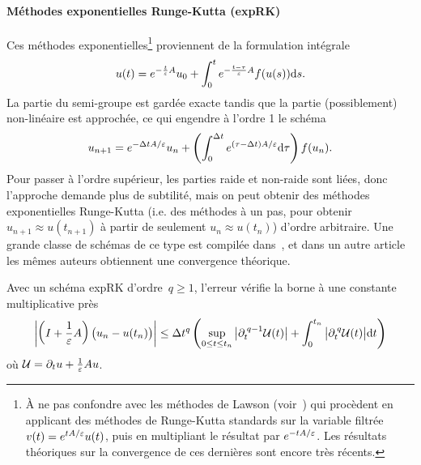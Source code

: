 

\paragraph{Méthodes exponentielles Runge-Kutta (expRK)\\}

Ces méthodes exponentielles\footnote{À ne pas confondre avec les méthodes de Lawson (voir~\cite{lawson.1967.generalized,hochbruck.2020.convergence}) qui procèdent en applicant des méthodes de Runge-Kutta standards sur la variable filtrée $v(t) = e^{t A/\varepsilon}u(t)$, puis en multipliant le résultat par $e^{-t A/\varepsilon}$. Les résultats théoriques sur la convergence de ces dernières sont encore très récents.} proviennent de la formulation intégrale
\begin{equation*}
    u(t) = e^{-\frac{t}{\varepsilon}A}u_0 + \int_0^t e^{-\frac{t-\tau}{\varepsilon}A} f(u(s)) \mathrm{d} s .
\end{equation*}
La partie du semi-groupe est gardée exacte tandis que la partie (possiblement) non-linéaire est approchée, ce qui engendre à l'ordre 1 le schéma
\begin{equation} \label{sec:intro:eq:expEuler}
    u_{n+1} = e^{-\Delta t A/\varepsilon} u_n + \left(\int_0^{\Delta t} e^{(\tau-\Delta t) A/\varepsilon} \mathrm{d}\tau \right) f(u_n) .
\end{equation}
Pour passer à l'ordre supérieur, les parties raide et non-raide sont liées, donc l'approche demande plus de subtilité, mais on peut obtenir des méthodes exponentielles Runge-Kutta (i.e. des méthodes à un pas, pour obtenir $u_{n+1} \approx u(t_{n+1})$ à partir de seulement $u_n \approx u(t_n)$) d'ordre arbitraire. Une grande classe de schémas de ce type est compilée dans~\cite{hochbruck.2005.explicit}, et dans un autre article les mêmes auteurs obtiennent une convergence théorique. 
\begin{FRtheorem*}
    Avec un schéma expRK d'ordre~$q \geq 1$, l'erreur vérifie la borne à une constante multiplicative près
    \begin{equation*}
        \left| 
            \left( I + \frac{1}{\varepsilon}A \right) \big( u_n - u(t_n) \big) 
        \right|
        \leq \Delta t^{q} \left( 
            \sup_{0 \leq t \leq t_n} \big| \partial_t^{\: q-1} \mathcal{U}(t) \big| 
            + \int_0^{t_n} \big| \partial_t^{\: q} \mathcal{U}(t) \big| \mathrm{d} t 
        \right) 
    \end{equation*}
    où $\mathcal{U} = \partial_t u + \frac{1}{\varepsilon}Au$. 
\end{FRtheorem*}
